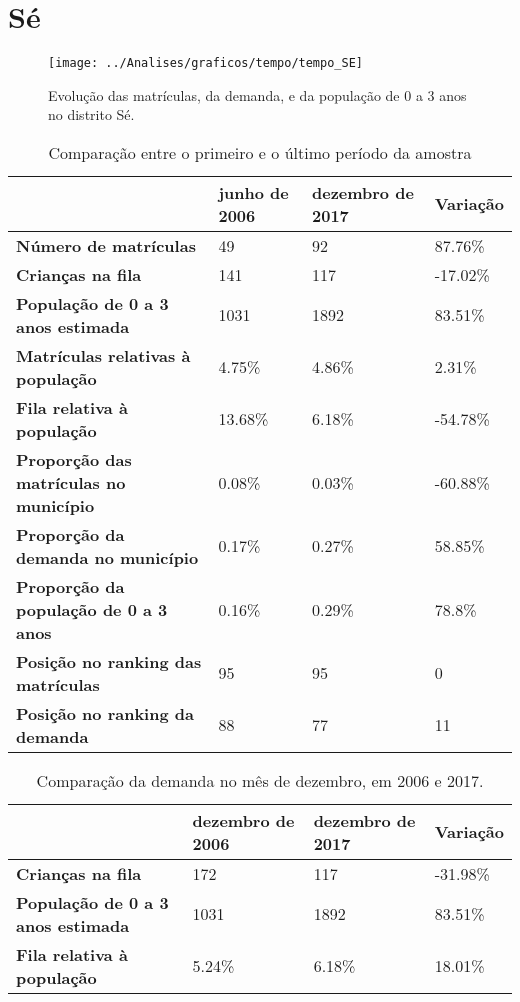 \section{Sé}
\begin{figure}[H]
\centering
\texttt{[image: ../Analises/graficos/tempo/tempo\_SE]}
\caption{Evolução das matrículas, da demanda, e da população de 0 a 3 anos no distrito Sé.}
\end{figure}
\begin{table}[H]
\begin{tabular}{|l|l|l|l|}
\hline
\textbf{}                                      & \textbf{junho de 2006}       & \textbf{dezembro de 2017}    & \textbf{Variação} \\ \hline
\textbf{Número de matrículas}                  & 49 & 92 & 87.76\% \\ \hline
\textbf{Crianças na fila}                      & 141 & 117 & -17.02\% \\ \hline
\textbf{População de 0 a 3 anos estimada}      & 1031 & 1892 & 83.51\% \\ \hline
\textbf{Matrículas relativas à população}      & 4.75\% & 4.86\% & 2.31\% \\ \hline
\textbf{Fila relativa à população}             & 13.68\% & 6.18\% & -54.78\% \\ \hline
\textbf{Proporção das matrículas no município} & 0.08\% & 0.03\% & -60.88\% \\ \hline
\textbf{Proporção da demanda no município}     & 0.17\% & 0.27\% & 58.85\% \\ \hline
\textbf{Proporção da população de 0 a 3 anos}  & 0.16\% & 0.29\% & 78.8\% \\ \hline
\textbf{Posição no ranking das matrículas}     & 95 & 95 & 0 \\ \hline
\textbf{Posição no ranking da demanda}         & 88 & 77 & 11 \\ \hline
\end{tabular}
\caption{Comparação entre o primeiro e o último período da amostra}
\end{table}
\begin{table}[H]
\begin{tabular}{|l|l|l|l|}
\hline
\textbf{}                                 & \textbf{dezembro de 2006} & \textbf{dezembro de 2017} & \textbf{Variação} \\ \hline
\textbf{Crianças na fila}                      & 172 & 117 & -31.98\% \\ \hline
\textbf{População de 0 a 3 anos estimada}      & 1031 & 1892 & 83.51\% \\ \hline
\textbf{Fila relativa à população}             & 5.24\% & 6.18\% & 18.01\% \\ \hline
\end{tabular}
\caption{Comparação da demanda no mês de dezembro, em 2006 e 2017.}
\end{table}

